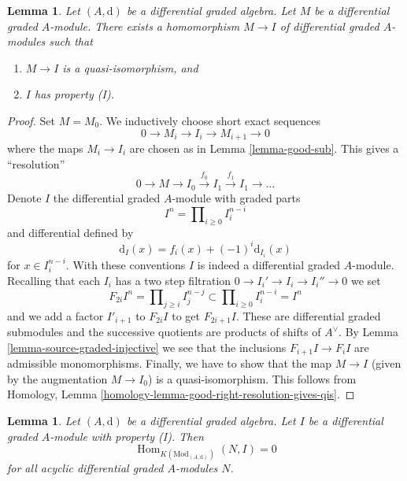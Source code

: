 \documentclass{stacks-project}
\theoremstyle{plain}
\newtheorem{lemma}[subsection]{Lemma}
\theoremstyle{definition}
\theoremstyle{remark}
\numberwithin{equation}{subsection}
\def\Hom{\mathop{\mathrm{Hom}}\nolimits}
\begin{document}
\begin{lemma}
\label{lemma-right-resolution}
Let $(A, \text{d})$ be a differential graded algebra.
Let $M$ be a differential graded $A$-module. There exists a homomorphism
$M \to I$ of differential graded $A$-modules such that
\begin{enumerate}
\item $M \to I$ is a quasi-isomorphism, and
\item $I$ has property (I).
\end{enumerate}
\end{lemma}

\begin{proof}
Set $M = M_0$. We inductively choose short exact sequences
$$
0 \to M_i \to I_i \to M_{i + 1} \to 0
$$
where the maps $M_i \to I_i$ are chosen as in Lemma \ref{lemma-good-sub}.
This gives a ``resolution''
$$
0 \to M \to I_0 \xrightarrow{f_0} I_1 \xrightarrow{f_1} I_1 \to \ldots
$$
Denote $I$ the differential graded $A$-module with graded parts
$$
I^n = \prod\nolimits_{i \geq 0} I^{n - i}_i
$$
and differential defined by
$$
\text{d}_I(x) = f_i(x) + (-1)^i \text{d}_{I_i}(x)
$$
for $x \in I_i^{n - i}$. With these conventions $I$ is indeed a differential
graded $A$-module. Recalling that each $I_i$ has a two step filtration
$0 \to I_i' \to I_i \to I_i'' \to 0$ we set
$$
F_{2i}I^n = \prod\nolimits_{j \geq i} I^{n - j}_j
\subset
\prod\nolimits_{i \geq 0} I^{n - i}_i = I^n
$$
and we add a factor $I'_{i + 1}$ to $F_{2i}I$ to get $F_{2i + 1}I$.
These are differential graded submodules and the successive quotients
are products of shifts of $A^\vee$. By
Lemma \ref{lemma-source-graded-injective} we see that
the inclusions $F_{i + 1}I \to F_iI$ are admissible monomorphisms.
Finally, we have to show that the map $M \to I$ (given by the
augmentation $M \to I_0$) is a quasi-isomorphism. This follows from
Homology, Lemma \ref{homology-lemma-good-right-resolution-gives-qis}.
\end{proof}

\begin{lemma}
\label{lemma-property-I-K-injective}
Let $(A, \text{d})$ be a differential graded algebra.
Let $I$ be a differential graded $A$-module with property (I).
Then
$$
\Hom_{K(\text{Mod}_{(A, \text{d})})}(N, I) = 0
$$
for all acyclic differential graded $A$-modules $N$.
\end{lemma}
\end{document}
